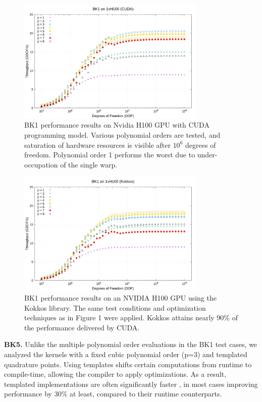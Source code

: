 \documentclass[a4paper,12pt]{article}
\begin{document}
\begin{figure}
\centering
\includegraphics[width=0.8\textwidth]{BK1_1}
\caption{BK1 performance results on Nvidia H100 GPU with CUDA programming model. Various polynomial orders are tested, and saturation of hardware resources is visible after $10^6$ degrees of freedom. Polynomial order 1 performs the worst due to under-occupation of the single warp.}
\label{fig:BK1_1}
\end{figure}
\begin{figure}
\centering
\includegraphics[width=0.8\textwidth]{BK1_2}
\caption{BK1 performance results on an NVIDIA H100 GPU using the Kokkos library. The same test conditions and optimization techniques as in Figure 1 were applied. Kokkos attains nearly 90\% of the performance delivered by CUDA.}
\label{fig:BK1_2}
\end{figure}

{\bf BK5.} Unlike the multiple polynomial order evaluations in the BK1 test cases, we analyzed the kernels with a fixed cubic polynomial order (p=3) and templated quadrature points. Using templates shifts certain computations from runtime to compile-time, allowing the compiler to apply optimizations. As a result, templated implementations are often significantly faster \citep{Kronbichler19}, in most cases improving performance by 30\% at least, compared to their runtime counterparts.
\end{document}
